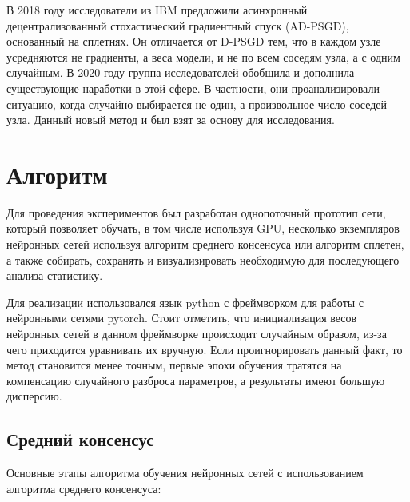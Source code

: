 \documentclass[a4paper,article,14pt]{extarticle}
\begin{document}
В 2018 году исследователи из IBM предложили \cite{o11} асинхронный децентрализованный стохастический градиентный спуск (AD-PSGD), основанный на сплетнях. Он отличается от D-PSGD тем, что в каждом узле усредняются не градиенты, а веса модели, и не по всем соседям узла, а с одним случайным. В 2020 году группа исследователей \cite{decentralized_sgd} обобщила и дополнила существующие наработки в этой сфере. В частности, они проанализировали ситуацию, когда случайно выбирается не один, а произвольное число соседей узла. Данный новый метод и был взят за основу для исследования.


\pagebreak
\section{Алгоритм}
Для проведения экспериментов был разработан однопоточный прототип сети, который позволяет обучать, в том числе используя GPU, несколько экземпляров нейронных сетей используя алгоритм среднего консенсуса или алгоритм сплетен, а также собирать, сохранять и визуализировать необходимую для последующего анализа статистику.

Для реализации использовался язык python с фреймворком для работы с нейронными сетями pytorch. Стоит отметить, что инициализация весов нейронных сетей в данном фреймворке происходит случайным образом, из-за чего приходится уравнивать их вручную. Если проигнорировать данный факт, то метод становится менее точным, первые эпохи обучения тратятся на компенсацию случайного разброса параметров, а результаты имеют большую дисперсию.
\subsection{Средний консенсус}
Основные этапы алгоритма обучения нейронных сетей с использованием алгоритма среднего консенсуса:
\end{document}
